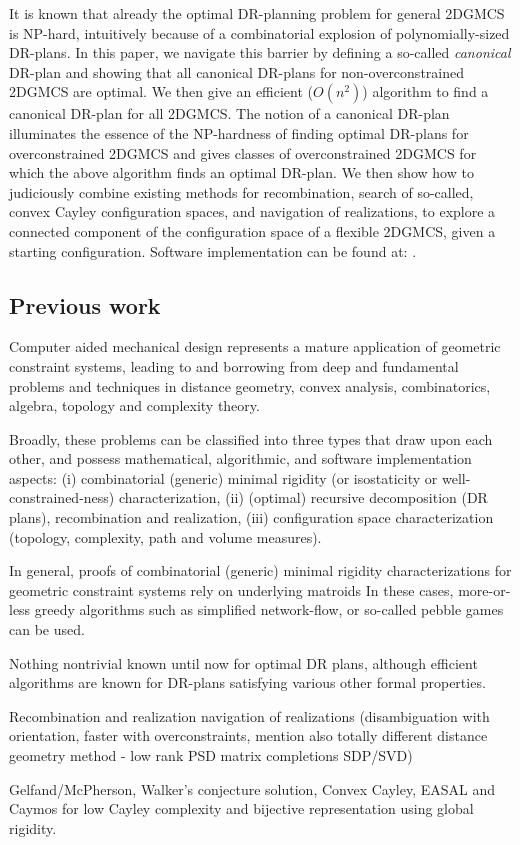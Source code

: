 It is known  that already the optimal DR-planning problem for general 2DGMCS is NP-hard, intuitively 
because of a combinatorial explosion of polynomially-sized DR-plans.  In this paper, we  navigate this barrier by defining a 
so-called {\it canonical} DR-plan and showing that all canonical DR-plans for non-overconstrained 2DGMCS are optimal. 
We then give an efficient ($O(n^2)$) algorithm to find a canonical DR-plan for all 2DGMCS. The notion of a canonical DR-plan 
illuminates the essence of the NP-hardness of finding optimal DR-plans for overconstrained 2DGMCS and gives classes of 
overconstrained 2DGMCS for which the above  algorithm finds an optimal DR-plan. We then show how to judiciously combine 
existing methods for recombination, search of so-called, convex Cayley configuration spaces, and navigation of realizations, 
to explore a connected component of the configuration space of a flexible 2DGMCS, given a starting configuration. 
Software implementation can be found at: .


\subsection{Previous work}

Computer aided mechanical design represents a mature application of geometric constraint systems,  leading to and borrowing 
from deep and fundamental problems and techniques in distance geometry, convex analysis, combinatorics, algebra, topology 
and complexity theory.

Broadly, these problems can be classified into three types that draw upon each other, and possess mathematical, algorithmic, 
and software implementation aspects: (i) combinatorial (generic) minimal rigidity (or isostaticity or well-constrained-ness) 
characterization, (ii) (optimal) recursive decomposition (DR plans), recombination and realization, (iii) configuration space 
characterization (topology, complexity, path and volume measures).

In general, proofs of combinatorial (generic) minimal rigidity characterizations for geometric constraint systems rely on 
underlying matroids  In these cases, more-or-less greedy algorithms such as simplified network-flow, 
or so-called pebble games can be used.

Nothing nontrivial known until now for optimal DR plans, although efficient algorithms are known for DR-plans satisfying 
various other formal properties.

Recombination and realization navigation of realizations (disambiguation with orientation, faster with overconstraints, mention 
also totally different distance geometry method - low rank PSD matrix completions SDP/SVD)

Gelfand/McPherson, Walker's conjecture solution, Convex Cayley, EASAL and Caymos for low Cayley complexity and bijective 
representation using global rigidity.

